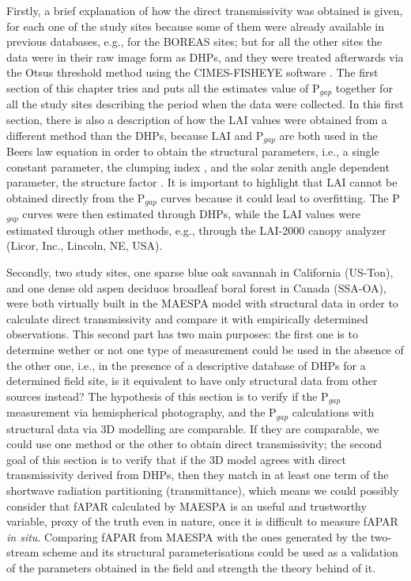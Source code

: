 \documentclass[a4paper,11pt]{report}
\begin{document}
Firstly, a brief explanation of how the direct transmissivity was obtained is given, for each one of the study sites because some of them were already available in previous databases, e.g., for the BOREAS sites; but for all the other sites the data were in their raw image form as DHPs, and they were treated afterwards via the Otsu\textquotesingle s threshold method \citep{Otsu1979} using the CIMES-FISHEYE software \citep{Walter2012}. The first section of this chapter tries and puts all the estimates value of P$_{gap}$ together for all the study sites describing the period when the data were collected. In this first section, there is also a description of how the LAI values were obtained from a different method than the DHPs, because LAI and P$_{gap}$ are both used in the Beer\textquotesingle s law equation in order to obtain the structural parameters, i.e., a single constant parameter, the clumping index \citep{Nilson1971}, and the solar zenith angle dependent parameter, the structure factor \citep{pinty2006}. It is important to highlight that LAI cannot be obtained directly from the P$_{gap}$ curves because it could lead to overfitting. The P$_{gap}$ curves were then estimated through DHPs, while the LAI values were estimated through other methods, e.g., through the LAI-2000 canopy analyzer (Licor, Inc., Lincoln, NE, USA).

Secondly, two study sites, one sparse blue oak savannah in California (US-Ton), and one dense old aspen deciduos broadleaf boral forest in Canada (SSA-OA), were both virtually built in the MAESPA model with structural data in order to calculate direct transmissivity and compare it with empirically determined observations. This second part has two main purposes: the first one is to determine wether or not one type of measurement could be used in the absence of the other one, i.e., in the presence of a descriptive database of DHPs for a determined field site, is it equivalent to have only structural data from other sources instead? The hypothesis of this section is to verify if the P$_{gap}$ measurement via hemispherical photography, and the P$_{gap}$ calculations with structural data via 3D modelling are comparable. If they are comparable, we could use one method or the other to obtain direct transmissivity; the second goal of this section is to verify that if the 3D model agrees with direct transmissivity derived from DHPs, then they match in at least one term of the shortwave radiation partitioning (transmittance), which means we could possibly consider that fAPAR calculated by MAESPA is an useful and trustworthy variable, proxy of the truth even in nature, once it is difficult to measure fAPAR \textit{in situ}. Comparing fAPAR from MAESPA with the ones generated by the two-stream scheme and its structural parameterisations could be used as a validation of the parameters obtained in the field and strength the theory behind of it.
\end{document}
